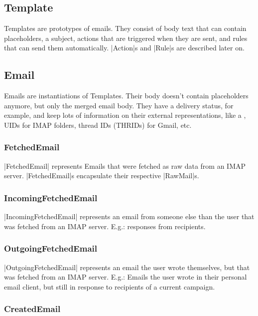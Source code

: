\subsection{Template}

Templates are prototypes of emails. They consist of body text that can contain placeholders, a subject, actions that are triggered when they are sent, and rules that can send them automatically. |Action|s and |Rule|s are described later on.

\subsection{Email}

Emails are instantiations of Templates. Their body doesn’t contain placeholders anymore, but only the merged email body. They have a delivery status, for example, and keep lots of information on their external representations, like a , UIDs for IMAP folders, thread IDs (THRIDs) for Gmail, etc.

\subsubsection{FetchedEmail}

|FetchedEmail| represents Emails that were fetched as raw data from an IMAP server. |FetchedEmail|s encapsulate their respective |RawMail|s.

\subsubsection{IncomingFetchedEmail}

|IncomingFetchedEmail| represents an email from someone else than the user that was fetched from an IMAP server. E.g.: responses from recipients.

\subsubsection{OutgoingFetchedEmail}

|OutgoingFetchedEmail| represents an email the user wrote themselves, but that was fetched from an IMAP server. E.g.: Emails the user wrote in their personal email client, but still in response to recipients of a current campaign.

\subsubsection{CreatedEmail}

